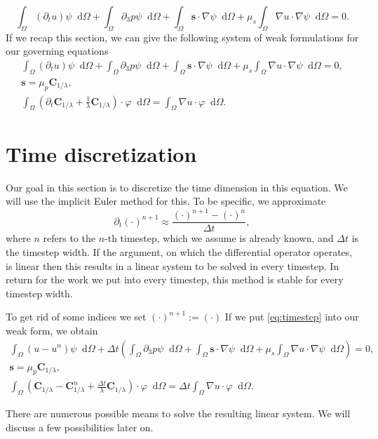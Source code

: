 \documentclass[12pt,a4paper,twoside, open=right]{scrreprt}
\theoremstyle{definition}
\theoremstyle{plain}
\newcommand{\bfs}{\bm{s}}
\newcommand{\bfC}{\bm{C}}
\newcommand{\D}{\mathop{}\!\mathrm{d}}
\begin{document}
\begin{equation}
    \int_\Omega(\partial_t u)\psi\D\Omega +\int_\Omega\partial_3 p\psi\D\Omega + \int_\Omega\bfs\cdot\nabla\psi\D\Omega+\mu_s\int_\Omega\nabla u\cdot\nabla\psi\D\Omega = 0.
\end{equation}
If we recap this section, we can give the following system of weak formulations for our governing equations
\begin{align}
     \int_\Omega(\partial_t u)\psi\D\Omega +\int_\Omega\partial_3 p\psi\D\Omega + \int_\Omega\bfs\cdot\nabla\psi\D\Omega+\mu_s\int_\Omega\nabla u\cdot\nabla\psi\D\Omega = 0,\\
     \bfs =\mu_p\bfC_{1/\lambda},\\
      \int_\Omega(\partial_t\bfC_{1/\lambda}+\frac{1}{\lambda}\bfC_{1/\lambda})\cdot\varphi\D\Omega = 
     \int_\Omega \nabla u\cdot\varphi\D\Omega.
\end{align}

\section{Time discretization}
Our goal in this section is to discretize the time dimension in this equation. We will use the implicit Euler method for this. To be specific, we approximate 
\begin{equation}
    \partial_t(\cdot)^{n+1}\approx\frac{(\cdot)^{n+1}-(\cdot)^n}{\Delta t},\label{eq:timestep}
\end{equation}
where $n$ refers to the $n$-th timestep, which we assume is already known, and $\Delta t$ is the timestep width. If the argument, on which the differential operator operates, is linear then this results in a linear system to be solved in every timestep. In return for the work we put into every timestep, this method is stable for every timestep width.
\par 
To get rid of some indices we set $(\cdot)^{n+1}:=(\cdot)$ If we put \eqref{eq:timestep} into our weak form, we obtain 
\begin{align}
  \int_\Omega(u-u^n)\psi\D\Omega +\Delta t\left(\int_\Omega\partial_3 p\psi\D\Omega + \int_\Omega\bfs\cdot\nabla\psi\D\Omega+\mu_s\int_\Omega\nabla u\cdot\nabla\psi\D\Omega\right) = 0,\\
  \bfs =\mu_p\bfC_{1/\lambda},\\
  \int_\Omega(\bfC_{1/\lambda} - \bfC_{1/\lambda}^n +\frac{\Delta t}{\lambda}\bfC_{1/\lambda})\cdot\varphi\D\Omega = 
  \Delta t\int_\Omega\nabla u\cdot\varphi\D\Omega.
\end{align}
\par 
There are numerous possible means to solve the resulting linear system. We will discuss a few possibilities later on.
\end{document}

